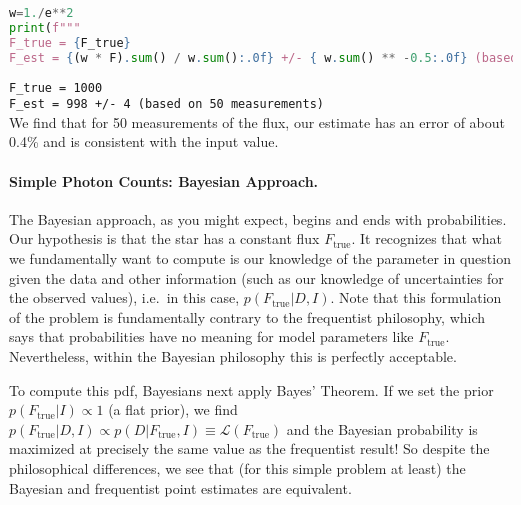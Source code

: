 \documentclass[%
oneside,                 %
final,                   %
10pt]{article}
\begin{document}
\begin{lstlisting}[language=Python,style=blue1]
w=1./e**2
print(f"""
F_true = {F_true}
F_est = {(w * F).sum() / w.sum():.0f} +/- { w.sum() ** -0.5:.0f} (based on {N} measurements) """)
\end{lstlisting}
\Verb!F_true = 1000! \\
\Verb!F_est = 998 +/- 4 (based on 50 measurements)! \\

We find that for 50 measurements of the flux, our estimate has an error of about 0.4\% and is consistent with the input value.


\paragraph{Simple Photon Counts: Bayesian Approach.}
The Bayesian approach, as you might expect, begins and ends with probabilities. Our hypothesis is that the star has a constant flux $F_\mathrm{true}$. It recognizes that what we fundamentally want to compute is our knowledge of the parameter in question given the data and other information (such as our knowledge of uncertainties for the observed values), i.e.~in this case, $p(F_\mathrm{true} | D,I)$.
Note that this formulation of the problem is fundamentally contrary to the frequentist philosophy, which says that probabilities have no meaning for model parameters like $F_\mathrm{true}$. Nevertheless, within the Bayesian philosophy this is perfectly acceptable.

To compute this pdf, Bayesians next apply Bayes' Theorem.
If we set the prior $p(F_\mathrm{true}|I) \propto 1$ (a flat prior), we find
$p(F_\mathrm{true}|D,I) \propto p(D | F_\mathrm{true},I) \equiv \mathcal{L}(F_\mathrm{true})$
and the Bayesian probability is maximized at precisely the same value as the frequentist result! So despite the philosophical differences, we see that (for this simple problem at least) the Bayesian and frequentist point estimates are equivalent.
\end{document}
